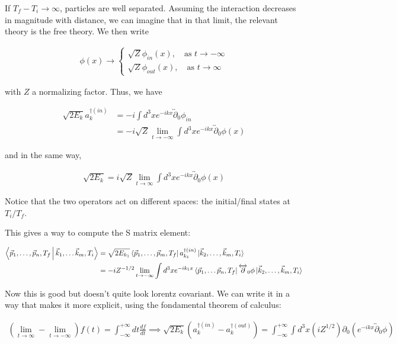 \documentclass{report}
\begin{document}
If \(T_f-T_i \rightarrow \infty\), particles are well separated. Assuming the interaction decreases in magnitude with distance, we can imagine that in that limit, the relevant theory is the free theory. We then write

\begin{align}
    \phi(x) \rightarrow \begin{cases}
        \sqrt{Z}\phi_{in}(x), \quad \text{as } t \rightarrow -\infty \\
        \sqrt{Z}\phi_{out}(x), \quad \text{as } t \rightarrow \infty 
    \end{cases}
\end{align}

with \(Z\) a normalizing factor. Thus, we have 

\begin{align}
    \sqrt{2E_k}a^{\dagger(in)}_k &= -i\int d^3x e^{-ikx}\overleftrightarrow{\partial}_0 \phi_{in} \\
    &= -i\sqrt{Z}\lim_{t\rightarrow -\infty}\int d^3x e^{-ikx}\overleftrightarrow{\partial}_0 \phi(x) 
\end{align}

and in the same way, 

\begin{align}
    \sqrt{2E_k} = i\sqrt{Z}\lim_{t\rightarrow \infty}\int d^3x e^{-ikx}\overleftrightarrow{\partial}_0 \phi(x) 
\end{align}

Notice that the two operators act on different spaces: the initial/final states at \(T_i / T_f\). 

This gives a way to compute the S matrix element: 

\begin{align}
    \Braket{\vec{p}_1, \ldots, \vec{p}_n, T_f | \vec{k}_1, \ldots \vec{k}_m, T_i} &= \sqrt{2E_{k_1}}\bra{\vec{p}_1, \ldots, \vec{p}_m, T_f}a^{\dagger(in)}_{k_1}\ket{\vec{k}_2, \ldots, \vec{k}_m, T_i} \\
    &= -iZ^{-1/2}\lim_{t\rightarrow -\infty}\int d^3x e^{-ik_1x}\bra{\vec{p}_1, \ldots \vec{p}_n, T_f}\overleftrightarrow{\partial}_0\phi\ket{\vec{k}_2, \ldots, \vec{k}_m, T_i}
\end{align}

Now this is good but doesn't quite look lorentz covariant. We can write it in a way that makes it more explicit, using the fondamental theorem of calculus: 

\begin{align}
    \left(\lim_{t\rightarrow \infty} - \lim_{t\rightarrow -\infty} \right)f(t) = \int_{-\infty}^{+\infty}dt \frac{df}{dt} \implies \sqrt{2E_{k}}(a^{\dagger(in)}_k - a^{\dagger(out)}_k) = \int_{-\infty}^{+\infty} \int d^3x (iZ^{1/2})\partial_0 (e^{-ikx}\overleftrightarrow{\partial}_0 \phi)
\end{align}
\end{document}
